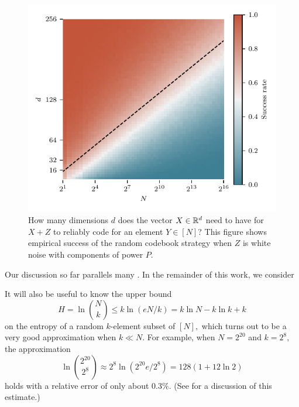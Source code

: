 \begin{figure}
	\begin{minipage}[c]{0.5\textwidth}
	\includegraphics[width=\textwidth]{../figures/symbol_transmission}
	\end{minipage}%
	\begin{minipage}[c]{0.5\textwidth}
	\vspace{20pt}
	\caption{How many dimensions $d$ does the vector $X \in \mathbb{R}^d$ need to have for $X + Z$ to reliably code for an element $Y \in [N]$? This figure shows empirical success of the random codebook strategy when $Z$ is white noise with components of power $P.$}
	\label{fig:transmission}
	\end{minipage}
\end{figure}

Our discussion so far parallels many \cite{cover_elements_2006}. In the remainder of this work, we consider

It will also be useful to know the upper bound
$$
	H = \ln \binom N k \le k \ln (eN/k) = k \ln N - k \ln k + k
$$
on the entropy of a random $k$-element subset of $[N],$ which turns out to be a very good approximation when $k \ll N.$ For example, when $N = 2^{20}$ and $k = 2^8,$ the approximation
$$
	\ln \binom{2^{20}}{2^8} \approx 2^8 \ln(2^{20} e/2^8) = 128 (1 + 12 \ln 2)
$$
holds with a relative error of only about $0.3 \%.$ (See  for a discussion of this estimate.)
